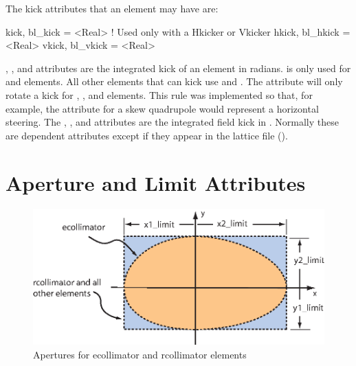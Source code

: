 The kick attributes that an element may have are:
\begin{example}
  kick,  bl_kick  = <Real>  ! Used only with a Hkicker or Vkicker
  hkick, bl_hkick = <Real>
  vkick, bl_vkick = <Real>
\end{example}
, , and  attributes are the integrated
kick of an element in radians.  is only used for 
and  elements. All other elements that can kick use
 and . The  attribute will only rotate a
kick for , ,  and 
elements. This rule was implemented so that, for example, the
 attribute for a skew quadrupole would represent a
horizontal steering. The , , and
 attributes are the integrated field kick in
. Normally these are dependent attributes except if
they appear in the lattice file ().

\section{Aperture and Limit Attributes}
\label{s:limit}

\begin{figure}[ht]
  \centering
  \includegraphics{apertures.eps}
  \caption{Apertures for ecollimator and rcollimator elements}
  \label{f:limit}
\end{figure}


